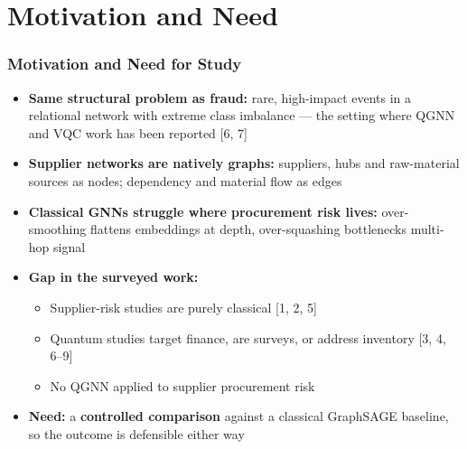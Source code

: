 \documentclass{beamer}
\newcommand{\bodyfont}{\small}
\begin{document}
\section[Motivation]{Motivation and Need}
\begin{frame}[shrink=6]
\frametitle{Motivation and Need for Study}
\bodyfont
\begin{itemize}
  \item \textbf{Same structural problem as fraud:} rare, high-impact events in a
        relational network with extreme class imbalance --- the setting where
        QGNN and VQC work has been reported [6, 7]
  \vspace{0.4em}
  \item \textbf{Supplier networks are natively graphs:} suppliers, hubs and
        raw-material sources as nodes; dependency and material flow as edges
  \vspace{0.4em}
  \item \textbf{Classical GNNs struggle where procurement risk lives:}
        over-smoothing flattens embeddings at depth, over-squashing bottlenecks
        multi-hop signal
  \vspace{0.4em}
  \item \textbf{Gap in the surveyed work:}
  \begin{itemize}
    \item Supplier-risk studies are purely classical [1, 2, 5]
    \item Quantum studies target finance, are surveys, or address inventory [3, 4, 6--9]
    \item No QGNN applied to supplier procurement risk
  \end{itemize}
  \vspace{0.4em}
  \item \textbf{Need:} a \textbf{controlled comparison} against a classical
        GraphSAGE baseline, so the outcome is defensible either way
\end{itemize}
\end{frame}
\end{document}
